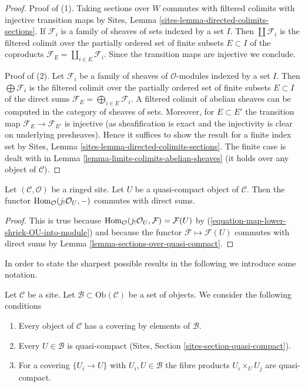 \begin{proof}
Proof of (1). Taking sections over $W$ commutes with filtered colimits
with injective transition maps by
Sites, Lemma \ref{sites-lemma-directed-colimits-sections}.
If $\mathcal{F}_i$ is a family of sheaves of sets
indexed by a set $I$. Then $\coprod \mathcal{F}_i$ is the filtered
colimit over the partially ordered set of finite subsets
$E \subset I$ of the coproducts
$\mathcal{F}_E = \coprod_{i \in E} \mathcal{F}_i$.
Since the transition maps are injective we conclude.

\medskip\noindent
Proof of (2).
Let $\mathcal{F}_i$ be a family of sheaves of $\mathcal{O}$-modules
indexed by a set $I$. Then $\bigoplus \mathcal{F}_i$ is the filtered
colimit over the partially ordered set of finite subsets
$E \subset I$ of the direct sums
$\mathcal{F}_E = \bigoplus_{i \in E} \mathcal{F}_i$.
A filtered colimit of abelian sheaves can be computed in the
category of sheaves of sets. Moreover, for $E \subset E'$ the transition map
$\mathcal{F}_E \to \mathcal{F}_{E'}$ is injective (as sheafification
is exact and the injectivity is clear on underlying presheaves).
Hence it suffices to show the result for a finite index set by
Sites, Lemma \ref{sites-lemma-directed-colimits-sections}.
The finite case is dealt with in
Lemma \ref{lemma-limits-colimits-abelian-sheaves}
(it holds over any object of $\mathcal{C}$).
\end{proof}

\begin{lemma}
\label{lemma-quasi-compact-hom-from}
Let $(\mathcal{C}, \mathcal{O})$ be a ringed site. Let $U$ be a quasi-compact
object of $\mathcal{C}$. Then the functor
$\mathop{\mathrm{Hom}}\nolimits_\mathcal{O}(j_!\mathcal{O}_U, -)$ commutes with direct sums.
\end{lemma}

\begin{proof}
This is true because
$\mathop{\mathrm{Hom}}\nolimits_\mathcal{O}(j_!\mathcal{O}_U, \mathcal{F}) = \mathcal{F}(U)$
by (\ref{equation-map-lower-shriek-OU-into-module})
and because the functor $\mathcal{F} \mapsto \mathcal{F}(U)$
commutes with direct sums by
Lemma \ref{lemma-sections-over-quasi-compact}.
\end{proof}

\noindent
In order to state the sharpest possible results in the following
we introduce some notation.

\begin{situation}
\label{situation-quasi-compact-objects}
Let $\mathcal{C}$ be a site. Let
$\mathcal{B} \subset \text{Ob}(\mathcal{C})$ be a set
of objects. We consider the following conditions
\begin{enumerate}
\item
\label{item-enough}
Every object of $\mathcal{C}$ has a covering by elements of $\mathcal{B}$.
\item
\label{item-enough-qc}
Every $U \in \mathcal{B}$ is quasi-compact
(Sites, Section \ref{sites-section-quasi-compact}).
\item
\label{item-enough-qc-qs}
For a covering $\{U_i \to U\}$ with $U_i, U \in \mathcal{B}$
the fibre products $U_i \times_U U_j$ are quasi-compact.
\end{enumerate}
\end{situation}


